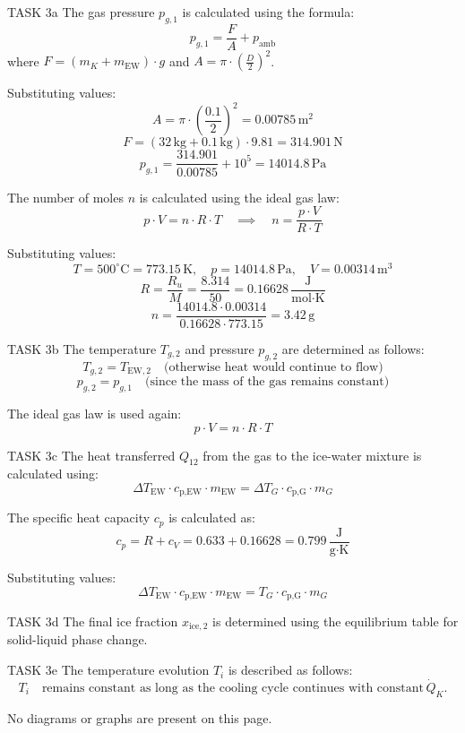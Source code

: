 TASK 3a  
The gas pressure \( p_{g,1} \) is calculated using the formula:  
\[
p_{g,1} = \frac{F}{A} + p_{\text{amb}}
\]  
where \( F = (m_K + m_{\text{EW}}) \cdot g \) and \( A = \pi \cdot \left(\frac{D}{2}\right)^2 \).  

Substituting values:  
\[
A = \pi \cdot \left(\frac{0.1}{2}\right)^2 = 0.00785 \, \text{m}^2
\]  
\[
F = (32 \, \text{kg} + 0.1 \, \text{kg}) \cdot 9.81 = 314.901 \, \text{N}
\]  
\[
p_{g,1} = \frac{314.901}{0.00785} + 10^5 = 14014.8 \, \text{Pa}
\]  

The number of moles \( n \) is calculated using the ideal gas law:  
\[
p \cdot V = n \cdot R \cdot T \quad \implies \quad n = \frac{p \cdot V}{R \cdot T}
\]  

Substituting values:  
\[
T = 500^\circ\text{C} = 773.15 \, \text{K}, \quad p = 14014.8 \, \text{Pa}, \quad V = 0.00314 \, \text{m}^3
\]  
\[
R = \frac{R_u}{M} = \frac{8.314}{50} = 0.16628 \, \frac{\text{J}}{\text{mol·K}}
\]  
\[
n = \frac{14014.8 \cdot 0.00314}{0.16628 \cdot 773.15} = 3.42 \, \text{g}
\]  

TASK 3b  
The temperature \( T_{g,2} \) and pressure \( p_{g,2} \) are determined as follows:  
\[
T_{g,2} = T_{\text{EW},2} \quad \text{(otherwise heat would continue to flow)}
\]  
\[
p_{g,2} = p_{g,1} \quad \text{(since the mass of the gas remains constant)}
\]  

The ideal gas law is used again:  
\[
p \cdot V = n \cdot R \cdot T
\]  

TASK 3c  
The heat transferred \( Q_{12} \) from the gas to the ice-water mixture is calculated using:  
\[
\Delta T_{\text{EW}} \cdot c_{\text{p,EW}} \cdot m_{\text{EW}} = \Delta T_G \cdot c_{\text{p,G}} \cdot m_G
\]  

The specific heat capacity \( c_p \) is calculated as:  
\[
c_p = R + c_V = 0.633 + 0.16628 = 0.799 \, \frac{\text{J}}{\text{g·K}}
\]  

Substituting values:  
\[
\Delta T_{\text{EW}} \cdot c_{\text{p,EW}} \cdot m_{\text{EW}} = T_G \cdot c_{\text{p,G}} \cdot m_G
\]  

TASK 3d  
The final ice fraction \( x_{\text{ice},2} \) is determined using the equilibrium table for solid-liquid phase change.  

TASK 3e  
The temperature evolution \( T_i \) is described as follows:  
\[
T_i \quad \text{remains constant as long as the cooling cycle continues with constant} \, \dot{Q}_K.
\]  

No diagrams or graphs are present on this page.